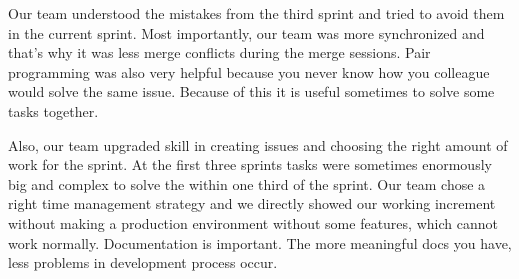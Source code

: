 Our team understood the mistakes from the third sprint and tried to avoid them in the current sprint. Most importantly, our team was more synchronized and that’s why it was less merge conflicts during the merge sessions. Pair programming was also very helpful because you never know how you colleague would solve the same issue. Because of this it is useful sometimes to solve some tasks together. 

Also, our team upgraded skill in creating issues and choosing the right amount of work for the sprint. At the first three sprints tasks were sometimes enormously big and complex to solve the within one third of the sprint. Our team chose a right time management strategy and we directly showed our working increment without making a production environment without some features, which cannot work normally. Documentation is important. The more meaningful docs you have, less problems in development process occur.

\pagebreak
\let\cleardoublepage\clearpage